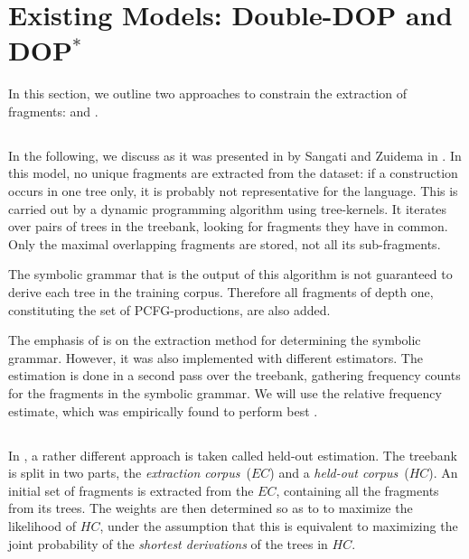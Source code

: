 
\section{Existing Models: Double-DOP and DOP$^*$}\label{sec:Existing}


In this section, we outline two approaches to constrain the extraction of fragments: \ddop{} and \dops{}. 

\subsection{\ddop}
In the following, we discuss \ddop{} as it was presented in by Sangati and Zuidema in . In this model, no unique fragments are extracted from the dataset: if a construction occurs in one tree only, it is probably not representative for the language. This is carried out by a dynamic programming algorithm using tree-kernels. It iterates over pairs of trees in the treebank, looking for fragments they have in common. Only the maximal overlapping fragments are stored, not all its sub-fragments.

The symbolic grammar that is the output of this algorithm is not guaranteed to derive each tree in the training corpus. Therefore all fragments of depth one, constituting the set of PCFG-productions, are also added.

The emphasis of \ddop{} is on the extraction method for determining the symbolic grammar. However, it was also implemented with different estimators. The estimation is done in a second pass over the treebank, gathering frequency counts for the fragments in the symbolic grammar. We will use the relative frequency estimate, which was empirically found to perform best \cite{sangati2011}.

\subsection{\dops}
In \dops{} \cite{zollmann2005}, a rather different approach is taken called held-out estimation. The treebank is split in two parts, the \emph{extraction corpus}~($EC$) and a \emph{held-out corpus}~($HC$). An initial set of fragments is extracted from the $EC$, containing all the fragments from its trees. The weights are then determined so as to to maximize the likelihood of $HC$, under the assumption that this is equivalent to maximizing the joint probability of the \emph{shortest derivations} of the trees in $HC$. 

